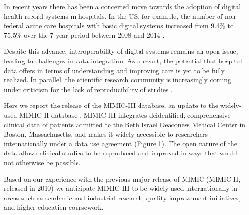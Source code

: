 \documentclass[english]{article}
\begin{document}

In recent years there has been a concerted move towards the adoption of digital health record systems in hospitals. In the US, for example, the number of non-federal acute care hospitals with basic digital systems increased from 9.4\% to 75.5\% over the 7 year period between 2008 and 2014 \cite{cite1}.

Despite this advance, interoperability of digital systems remains an open issue, leading to challenges in data integration. As a result, the potential that hospital data offers in terms of understanding and improving care is yet to be fully realized. In parallel, the scientific research community is increasingly coming under criticism for the lack of reproducibility of studies \cite{cite2}.

Here we report the release of the MIMIC-III database, an update to the widely-used MIMIC-II database \cite{cite3}. MIMIC-III integrates deidentified, comprehensive clinical data of patients admitted to the Beth Israel Deaconess Medical Center in Boston, Massachusetts, and makes it widely accessible to researchers internationally under a data use agreement (Figure 1). The open nature of the data allows clinical studies to be reproduced and improved in ways that would not otherwise be possible.

Based on our experience with the previous major release of MIMIC (MIMIC-II, released in 2010) we anticipate MIMIC-III to be widely used internationally in areas such as academic and industrial research, quality improvement initiatives, and higher education coursework. 
\end{document}
